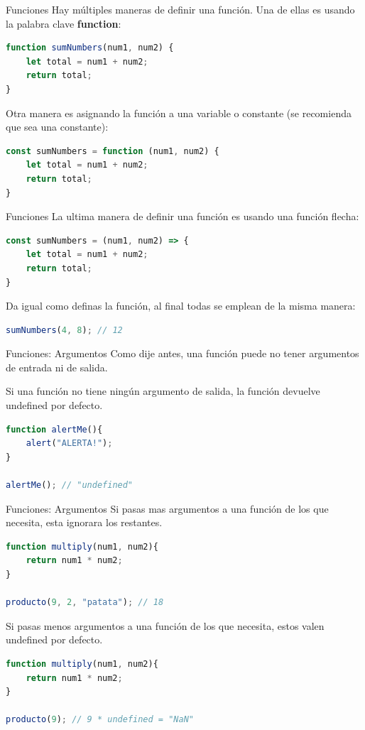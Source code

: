 \documentclass{beamer}
\begin{document}
\begin{frame}[fragile]{Funciones}
Hay múltiples maneras de definir una función. Una de ellas es usando la palabra clave \textbf{function}:
\begin{lstlisting}[language=JavaScript]
function sumNumbers(num1, num2) {
    let total = num1 + num2;
    return total;
}\end{lstlisting}
Otra manera es asignando la función a una variable o constante (se recomienda que sea una constante):
\begin{lstlisting}[language=JavaScript]
const sumNumbers = function (num1, num2) {
    let total = num1 + num2;
    return total;
}
\end{lstlisting}
\end{frame}

\begin{frame}[fragile]{Funciones}
La ultima manera de definir una función es usando una función flecha:
\begin{lstlisting}[language=JavaScript]
const sumNumbers = (num1, num2) => { 
    let total = num1 + num2; 
    return total;
}\end{lstlisting}

Da igual como definas la función, al final todas se emplean de la misma manera:
\begin{lstlisting}[language=JavaScript]
sumNumbers(4, 8); // 12
\end{lstlisting}
\end{frame}

\begin{frame}[fragile]{Funciones: Argumentos}
Como dije antes, una función puede no tener argumentos de entrada ni de salida.

Si una función no tiene ningún argumento de salida, la función devuelve undefined por defecto.
\begin{lstlisting}[language=JavaScript]
function alertMe(){
    alert("ALERTA!");
}

alertMe(); // "undefined"
\end{lstlisting}
\end{frame}

\begin{frame}[fragile]{Funciones: Argumentos}
Si pasas mas argumentos a una función de los que necesita, esta ignorara los restantes.
\begin{lstlisting}[language=JavaScript]
function multiply(num1, num2){
    return num1 * num2;
}

producto(9, 2, "patata"); // 18
\end{lstlisting}

Si pasas menos argumentos a una función de los que necesita, estos valen undefined por defecto.
\begin{lstlisting}[language=JavaScript]
function multiply(num1, num2){
    return num1 * num2;
}

producto(9); // 9 * undefined = "NaN"
\end{lstlisting}
\end{frame}
\end{document}
